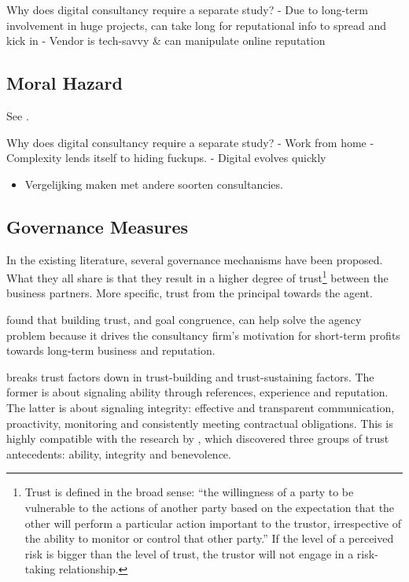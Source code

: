 \documentclass[12pt]{article}
\providecommand{\tightlist}{%
  \setlength{\itemsep}{0pt}\setlength{\parskip}{0pt}}
\begin{document}
Why does digital consultancy require a separate study? - Due to
long-term involvement in huge projects, can take long for reputational
info to spread and kick in - Vendor is tech-savvy \& can manipulate
online reputation

\hypertarget{moral-hazard}{%
\subsection{Moral Hazard}\label{moral-hazard}}

See \citep[ 72-73]{armbruster2006}.

Why does digital consultancy require a separate study? - Work from home
- Complexity lends itself to hiding fuckups. - Digital evolves quickly

\begin{itemize}
\tightlist
\item
  Vergelijking maken met andere soorten consultancies.
\end{itemize}

\hypertarget{governance-measures}{%
\subsection{Governance Measures}\label{governance-measures}}

In the existing literature, several governance mechanisms have been
proposed. What they all share is that they result in a higher degree of
trust\footnote{Trust is defined in the broad sense: ``the willingness of
  a party to be vulnerable to the actions of another party based on the
  expectation that the other will perform a particular action important
  to the trustor, irrespective of the ability to monitor or control that
  other party.'' \citep{kee1970} If the level of a perceived risk is
  bigger than the level of trust, the trustor will not engage in a
  risk-taking relationship.} between the business partners. More
specific, trust from the principal towards the agent.

\citet[265]{liberatore2010} found that building trust, and goal
congruence, can help solve the agency problem because it drives the
consultancy firm's motivation for short-term profits towards long-term
business and reputation.

\citet[193-194]{kirilov2012} breaks trust factors down in trust-building
and trust-sustaining factors. The former is about signaling ability
through references, experience and reputation. The latter is about
signaling integrity: effective and transparent communication,
proactivity, monitoring and consistently meeting contractual
obligations. This is highly compatible with the research by
\citet[717-720]{mayer1995}, which discovered three groups of trust
antecedents: ability, integrity and benevolence.
\end{document}
